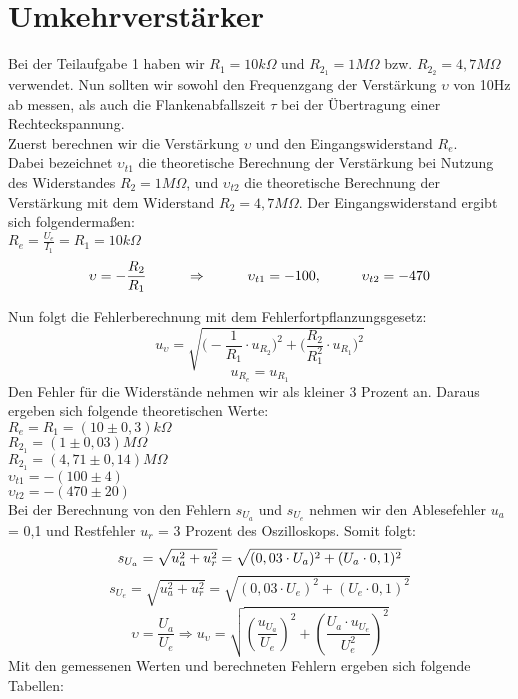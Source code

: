 

\section{Umkehrverstärker}
Bei der Teilaufgabe 1 haben wir $R_1=10k\Omega$ und $R_{2_1}=1M\Omega$ bzw. $R_{2_2}=4,7M\Omega$ verwendet. Nun sollten wir sowohl den Frequenzgang der Verstärkung $\upsilon$ von 10Hz ab messen, als auch die Flankenabfallszeit $\tau$ bei der Übertragung einer Rechteckspannung.\\
Zuerst berechnen wir die Verstärkung $\upsilon$ und den Eingangswiderstand $R_e$. \\
Dabei bezeichnet $\upsilon_{t1}$ die theoretische Berechnung der Verstärkung bei Nutzung des Widerstandes $R_2=1M\Omega$, und $\upsilon_{t2}$ die theoretische Berechnung der Verstärkung mit dem Widerstand $R_2=4,7M\Omega$. Der Eingangswiderstand ergibt sich folgendermaßen: \\
$R_e=\frac{U_e}{I_1}=R_1=10k\Omega$
\begin{equation}
\upsilon=-\frac{R_2}{R_1} \hspace*{1cm} \Rightarrow \hspace*{1cm} \upsilon_{t1}= -100, \hspace*{1cm} \upsilon_{t2}=-470
\end{equation}


Nun folgt die Fehlerberechnung mit dem Fehlerfortpflanzungsgesetz:
\begin{equation}
u_{\upsilon}=\sqrt{\bigl(-\frac{1}{R_1}\cdot u_{R_2}\bigr)^2 + {\bigl(\frac{R_2}{R_1^2}\cdot u_{R_1}\bigr)^2}}
\end{equation}
\begin{equation}
u_{R_e}=u_{R_1}
\end{equation}
Den Fehler für die Widerstände nehmen wir als kleiner 3 Prozent an. Daraus ergeben sich folgende theoretischen Werte:\\
$R_e=R_1=(10\pm 0,3)k\Omega$\\
$R_{2_1}=(1\pm 0,03)M\Omega$\\
$R_{2_1}=(4,71\pm 0,14)M\Omega$\\
$\upsilon_{t1}=-(100\pm4)$\\
$\upsilon_{t2}=-(470\pm20)$\\
Bei der Berechnung von den Fehlern $s_{U_a}$ und $s_{U_e}$ nehmen wir den Ablesefehler $u_a$= 0,1 und Restfehler $u_r$ = 3 Prozent des Oszilloskops. Somit folgt:
\begin{equation}
s_{U_a}=\sqrt{u_a^2+u_r^2}=\sqrt{(0,03 \cdot U_a)^2+(U_a\cdot 0,1)^2} \\
\end{equation}
\begin{equation}
s_{U_e}=\sqrt{u_a^2+u_r^2}=\sqrt{(0,03 \cdot U_e)^2+(U_e \cdot 0,1)^2} 
\end{equation}
\begin{equation}
\upsilon=\frac{U_a}{U_e} \Rightarrow u_\upsilon=\sqrt{(\frac{u_{U_a}}{U_e})^2+(\frac{U_a \cdot u_{U_e}}{U_e^2})^2}
\end{equation}
Mit den gemessenen Werten und berechneten Fehlern ergeben sich folgende Tabellen:

